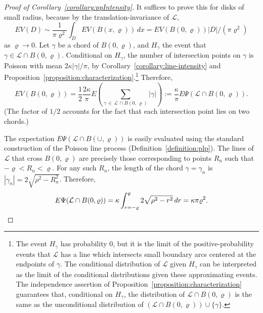 \documentclass[10pt]{amsart}
\theoremstyle{definition}\newtheorem{defi}[theo]{Definition}\newtheorem{rema}[theo]{Remark}\newtheorem{exam}[theo]{Example}\newtheorem{exem}[theo]{Example}\newtheorem{nota}[theo]{Notation}
\begin{document}
\begin{proof}[Proof of Corollary~\ref{corollary:ppIntensity}]
It suffices to prove this for disks of small radius, because by the translation-invariance of $\mathcal{L}$,
\[
EV (D)\sim \frac{1}{\pi
\varrho^{2}}\int_{D}EV (B (x,\varrho)) \,dx = EV (B (0,\varrho)) |D|/ (\pi \varrho^{2})
\]
as $\varrho \rightarrow 0$. Let $\gamma$ be a chord of $B (0,\varrho)$, and $H_{\gamma}$ the event that $\gamma \in
\mathcal{L}\cap B (0,\varrho)$. Conditional on $H_{\gamma}$, the number of intersection points on $\gamma$ is Poisson with mean $2\kappa |\gamma |/\pi $, by Corollary~\ref{corollary:line-intensity} and Proposition~\ref{proposition:characterization}.\footnote{The event $H_{\gamma}$ has probability $0$, but it is the limit of the positive-probability events that $\mathcal{L}$ has a line which intersects small boundary arcs centered at the endpoints of $\gamma$. The conditional distribution of $\mathcal{L}$ given $H_{\gamma}$ can be interpreted as the limit of the conditional distributions given these approximating events. The independence assertion of Proposition~\ref{proposition:characterization} guarantees that, conditional on $H_{\gamma}$, the distribution of $\mathcal{L}\cap B (0,\varrho)$ is the same as the unconditional distribution of $(\mathcal{L}\cap B (0,\varrho))\cup \{\gamma \}$.} Therefore,
\[
EV (B (0,\varrho))= \frac{1}{2} \frac{2\kappa}{\pi} E\left(\sum_{\gamma\,\in\,\mathcal{L}\,\cap B(0,\,\varrho)} |\gamma |\right):=\frac{\kappa}{\pi }E\Psi (\mathcal{L}\cap B (0,\varrho)).
\]
(The factor of $1/2$ accounts for the fact that each intersection point lies on two chords.)

The expectation $E\Psi (\mathcal{L}\cap B (\cup,\varrho))$ is easily evaluated using the standard construction of the Poisson line process (Definition~\ref{definition:plp}). The lines of $\mathcal{L}$ that cross $B (0,\varrho)$ are precisely those corresponding to points $R_{n}$ such that $-\varrho <R_{n}<\varrho$. For any such $R_{n}$, the length of the chord $\gamma=\gamma_{n}$ is $|\gamma_{n}|=2\sqrt{\rho^{2}-R_{n}^{2}}$. Therefore,
\[
E\Psi (\mathcal{L}\cap B (0,\varrho))=\kappa
\int_{r=-\varrho }^{\varrho} 2\sqrt{\rho^{2}-r^{2}} \,dr=\kappa \pi \varrho^{2}.\qedhere
\]
\end{proof}
\end{document}
